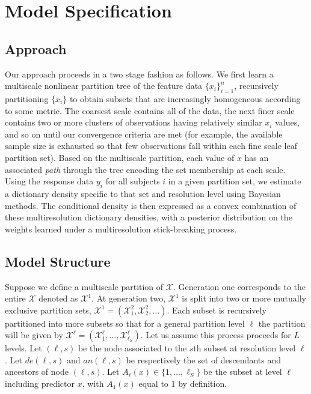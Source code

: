 \documentclass{article}
\begin{document}
\section{Model Specification} %
\label{sec:approach}
\subsection{Approach}

Our approach proceeds in a two stage fashion as follows. We first learn a multiscale nonlinear partition tree of the feature data $\{ x_i \}_{i=1}^n$, recursively partitioning $\{x_i \}$ to obtain subsets that are increasingly homogeneous according to some metric.  The coarsest scale contains all of the data, the next finer scale contains two or more clusters of observations having relatively similar $x_i$ values, and so on  until our convergence criteria are met (for example, the available sample size is exhausted so that few observations fall within each fine scale leaf partition set).  Based on the multiscale partition, each value of $x$ has an associated \emph{path} through the tree encoding the set membership at each scale.  Using the response data $y_i$ for all subjects $i$ in a given partition set, we estimate a dictionary density specific to that set and resolution level using Bayesian methods.  The conditional density is then expressed as a convex combination of these multiresolution dictionary densities, with a posterior distribution on the weights learned under a multiresolution stick-breaking process.


\subsection{ Model Structure} 

Suppose we define a multiscale partition of $\mathcal{X}$.  Generation one corresponds to the entire $\mathcal{X}$ denoted as $\mathcal{X}^1$.  At generation two, $\mathcal{X}^1$ is split into two or more mutually exclusive partition sets, $\mathcal{X}^1=\left(\mathcal{X}^2_1, \mathcal{X}^2_2, \ldots \right)$. Each subset is recursively partitioned into more subsets so that for a general partition level $\ell$ the partition will be given by $\mathcal{X}^{\ell}=\left(\mathcal{X}^{\ell}_1, \ldots, \mathcal{X}^{\ell}_{\ell_S}\right)$.  Let us assume this process proceeds for $L$ levels. Let $(\ell,s)$ be the node associated to the $s$th subset at resolution level $\ell$. Let $de(\ell,s)$ and $an(\ell,s)$ be respectively the set of descendants and ancestors of node $(\ell, s)$. Let $A_{\ell}(x) \in \{1, \ldots, \ell_S\}$ be the subset at level $\ell$ including predictor $x$, with $A_1(x)$ equal to 1 by definition. 
\end{document}
